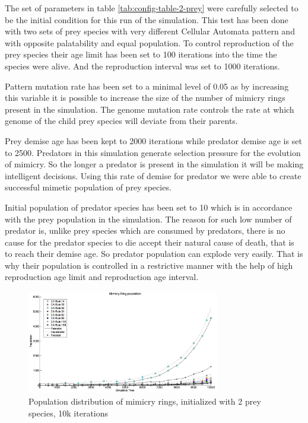 \documentclass[letterpaper]{article}
\numberwithin{equation}{section}
\begin{document}
The set of parameters in table \ref{tab:config-table-2-prey} were carefully selected to be the initial condition for this run of the simulation. This test has been done with two sets of prey species with very different Cellular Automata pattern and with opposite palatability and equal population. To control reproduction of the prey species their age limit has been set to 100 iterations into the time the species were alive. And the reproduction interval was set to 1000 iterations.

Pattern mutation rate has been set to a minimal level of 0.05 as by increasing this variable it is possible to increase the size of the number of mimicry rings present in the simulation. The genome mutation rate controls the rate at which genome of the child prey species will deviate from their parents.

Prey demise age has been kept to 2000 iterations while predator demise age is set to 2500. Predators in this simulation generate selection pressure for the evolution of mimicry. So the longer a predator is present in the simulation it will be making intelligent decisions. Using this rate of demise for predator we were able to create successful mimetic population of prey species.

Initial population of predator species has been set to 10 which is in accordance with the prey population in the simulation. The reason for such low number of predator is, unlike prey species which are consumed by predators, there is no cause for the predator species to die accept their natural cause of death, that is to reach their demise age. So predator population can explode very easily. That is why their population is controlled in a restrictive manner with the help of high reproduction age limit and reproduction age interval.

\begin{figure}[t!]
	\centering
	\includegraphics[width=0.75\textwidth]{../tex/images/simTime10k-2Prey}
	\caption[Population distribution of mimicry rings (2 prey species, 10k iterations)]{Population distribution of mimicry rings, initialized with 2 prey species, 10k iterations}
	\label{fig:plot-2-prey}
\end{figure}
\end{document}

